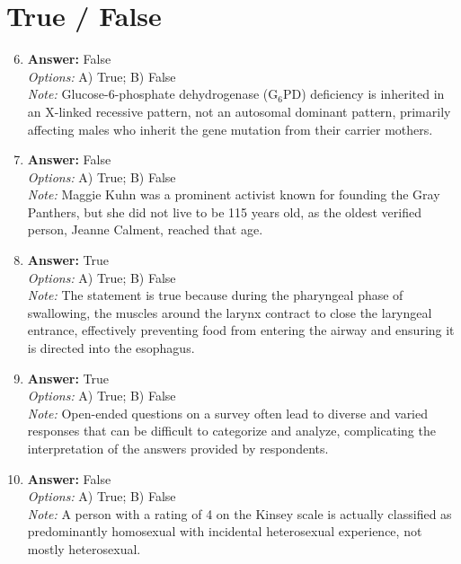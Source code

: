 \documentclass[12pt]{article}
\begin{document}
\section*{True / False}
\begin{enumerate}[label=\arabic*.]
\setcounter{enumi}{5}
\item \textbf{Answer:} False
\\ \textit{Options:} A) True; B) False
\\ \textit{Note:} Glucose-6-phosphate dehydrogenase (G$_{6}$PD) deficiency is inherited in an X-linked recessive pattern, not an autosomal dominant pattern, primarily affecting males who inherit the gene mutation from their carrier mothers.
\item \textbf{Answer:} False
\\ \textit{Options:} A) True; B) False
\\ \textit{Note:} Maggie Kuhn was a prominent activist known for founding the Gray Panthers, but she did not live to be 115 years old, as the oldest verified person, Jeanne Calment, reached that age.
\item \textbf{Answer:} True
\\ \textit{Options:} A) True; B) False
\\ \textit{Note:} The statement is true because during the pharyngeal phase of swallowing, the muscles around the larynx contract to close the laryngeal entrance, effectively preventing food from entering the airway and ensuring it is directed into the esophagus.
\item \textbf{Answer:} True
\\ \textit{Options:} A) True; B) False
\\ \textit{Note:} Open-ended questions on a survey often lead to diverse and varied responses that can be difficult to categorize and analyze, complicating the interpretation of the answers provided by respondents.
\item \textbf{Answer:} False
\\ \textit{Options:} A) True; B) False
\\ \textit{Note:} A person with a rating of 4 on the Kinsey scale is actually classified as predominantly homosexual with incidental heterosexual experience, not mostly heterosexual.
\end{enumerate}
\end{document}
